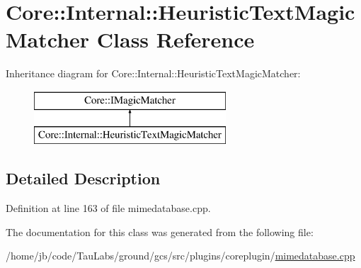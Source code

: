 \hypertarget{class_core_1_1_internal_1_1_heuristic_text_magic_matcher}{\section{\-Core\-:\-:\-Internal\-:\-:\-Heuristic\-Text\-Magic\-Matcher \-Class \-Reference}
\label{class_core_1_1_internal_1_1_heuristic_text_magic_matcher}
}
\-Inheritance diagram for \-Core\-:\-:\-Internal\-:\-:\-Heuristic\-Text\-Magic\-Matcher\-:\begin{figure}[H]
\begin{center}
\leavevmode
\includegraphics[height=2.000000cm]{class_core_1_1_internal_1_1_heuristic_text_magic_matcher}
\end{center}
\end{figure}


\subsection{\-Detailed \-Description}


\-Definition at line 163 of file mimedatabase.\-cpp.



\-The documentation for this class was generated from the following file\-:\begin{DoxyCompactItemize}
\item 
/home/jb/code/\-Tau\-Labs/ground/gcs/src/plugins/coreplugin/\hyperlink{mimedatabase_8cpp}{mimedatabase.\-cpp}\end{DoxyCompactItemize}
